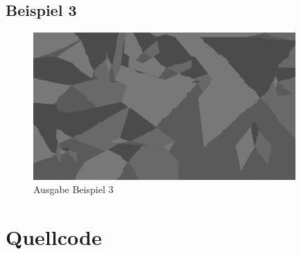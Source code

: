 \documentclass[a4paper,10pt,ngerman]{scrartcl}
\begin{document}
    \subsection{Beispiel 3}
      
      \begin{figure}[H]
        \centering
        \includegraphics[width=10cm]{../beispielausgaben/beispiel3.png}
        \caption{Ausgabe Beispiel 3}
      \end{figure}
  \section{Quellcode}
    
\end{document}
